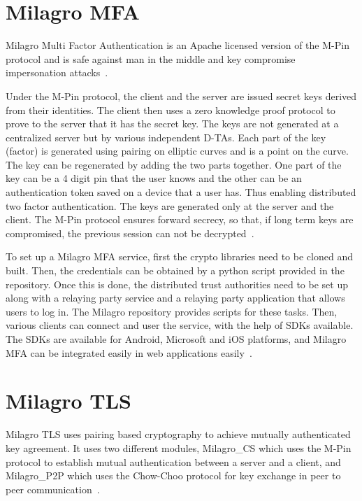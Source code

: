 \section{Milagro MFA}

Milagro Multi Factor Authentication is an Apache licensed version of
the M-Pin protocol and is safe against man in the middle and key
compromise impersonation attacks~\cite{hid-sp18-503-milagro-mfa}.

Under the M-Pin protocol, the client and the server are issued secret
keys derived from their identities. The client then uses a zero
knowledge proof protocol to prove to the server that it has the secret
key. The keys are not generated at a centralized server but by various
independent D-TAs. Each part of the key (factor) is generated using
pairing on elliptic curves and is a point on the curve. The key can be
regenerated by adding the two parts together. One part of the key can
be a 4 digit pin that the user knows and the other can be an
authentication token saved on a device that a user has. Thus enabling
distributed two factor authentication. The keys are generated only at
the server and the client. The M-Pin protocol ensures forward secrecy,
so that, if long term keys are compromised, the previous session can
not be decrypted~\cite{hid-sp18-503-milagro-protocols}.


To set up a Milagro MFA service, first the crypto libraries need to be
cloned and built. Then, the credentials can be obtained by a python
script provided in the repository.  Once this is done, the distributed
trust authorities need to be set up along with a relaying party
service and a relaying party application that allows users to log
in. The Milagro repository provides scripts for these tasks. Then,
various clients can connect and user the service, with the help of
SDKs available. The SDKs are available for Android, Microsoft and iOS
platforms, and Milagro MFA can be integrated easily in web
applications easily~\cite{hid-sp18-503-mfa-install}.


\section{Milagro TLS}

Milagro TLS uses pairing based cryptography to achieve mutually
authenticated key agreement. It uses two different modules,
Milagro\_CS which uses the M-Pin protocol to establish mutual
authentication between a server and a client, and Milagro\_P2P which
uses the Chow-Choo protocol for key exchange in peer to peer
communication~\cite{hid-sp18-503-mtls-white-paper}.


